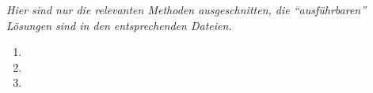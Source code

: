 

\usepackage{tikz}
\usetikzlibrary{arrows,automata}   

\date{Donnerstag 28.05.2020}


    \maketitle
    \thispagestyle{fancy}

    \textit{Hier sind nur die relevanten Methoden ausgeschnitten, die ``ausführbaren'' Lösungen sind in den entsprechenden Dateien.}
    \begin{enumerate}[label=\alph*)]
        \item \hfill
        
        \item \hfill
        
        \pagebreak
        \item \hfill
        
    \end{enumerate}




